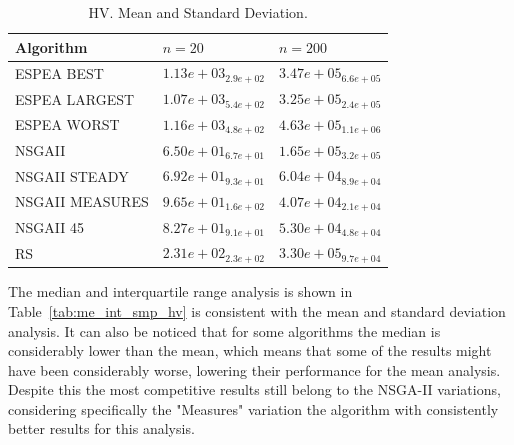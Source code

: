 \begin{table}[H]
    \centering
    {%
    \begin{tabular}{lll}
    \hline
    Algorithm & $n = 20$ & $n = 200 $ \\
    \hline
    ESPEA BEST & $  1.13e+03_{ 2.9e+02}$ & $  3.47e+05_{ 6.6e+05}$ \\
    ESPEA LARGEST & $  1.07e+03_{ 5.4e+02}$ & $  3.25e+05_{ 2.4e+05}$ \\
    ESPEA WORST & $  1.16e+03_{ 4.8e+02}$ & $  4.63e+05_{ 1.1e+06}$ \\
    NSGAII & \cellcolor{gray95} $6.50e+01_{ 6.7e+01}$ & $  1.65e+05_{ 3.2e+05}$ \\
    NSGAII STEADY & \cellcolor{gray25} $  6.92e+01_{ 9.3e+01}$ & $  6.04e+04_{ 8.9e+04}$ \\
    NSGAII MEASURES & $9.65e+01_{ 1.6e+02}$ & \cellcolor{gray95} $4.07e+04_{ 2.1e+04}$ \\
    NSGAII 45 & $  8.27e+01_{ 9.1e+01}$ & \cellcolor{gray25} $  5.30e+04_{ 4.8e+04}$ \\
    RS & $  2.31e+02_{ 2.3e+02}$ & $  3.30e+05_{ 9.7e+04}$ \\
    \hline
    \end{tabular}%
    }
    \caption{HV. Mean and Standard Deviation.}
    \label{tab:me_std_smp_hv}
\end{table}
    
The median and interquartile range analysis is shown in Table~\ref{tab:me_int_smp_hv} is consistent with the mean and standard deviation analysis. It can also be noticed that for some algorithms the median is considerably lower than the mean, which means that some of the results might have been considerably worse, lowering their performance for the mean analysis. Despite this the most competitive results still belong to the NSGA-II variations, considering specifically the "Measures" variation the algorithm with consistently better results for this analysis.
    
